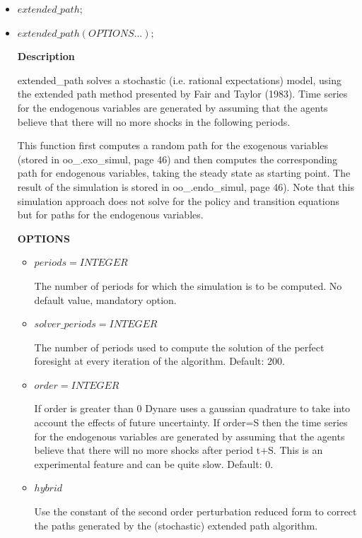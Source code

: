 \documentclass[cn,10pt,math=newtx,citestyle=gb7714-2015,bibstyle=gb7714-2015]{elegantbook}
\begin{document}
\begin{itemize}
	\item $extended\_path;$
	\item $extended\_path(OPTIONS...);$
	
	\textbf{Description}
	
	extended\_path solves a stochastic (i.e. rational expectations) model, using the extended path method presented by Fair and Taylor (1983). Time series for the endogenous variables are generated by assuming that the agents believe that there will no more shocks in the following periods.
	
	This function first computes a random path for the exogenous variables (stored in oo\_.exo\_simul, page 46) and then computes the corresponding path for endogenous variables, taking the steady state as starting point. The result of the simulation is stored in oo\_.endo\_simul, page 46). Note that this simulation approach does not solve for the policy and transition equations but for paths for the endogenous variables.
	
	\textbf{OPTIONS}
	\begin{itemize}
		\item $periods = INTEGER$
		
		The number of periods for which the simulation is to be computed. No default value, mandatory option.
		
		\item $solver\_periods = INTEGER$
		
		The number of periods used to compute the solution of the perfect foresight at every iteration of the algorithm. Default: 200.
		
		\item $order = INTEGER$
		
		If order is greater than 0 Dynare uses a gaussian quadrature to take into account the effects of future uncertainty. If order=S then the time series for the endogenous variables are generated by assuming that the agents believe that there will no more shocks after period t+S. This is an experimental feature and can be quite slow. Default: 0.
		
		\item $hybrid$
		
		Use the constant of the second order perturbation reduced form to correct the paths generated by the (stochastic) extended path algorithm.
	\end{itemize}
	
	
\end{itemize}
\end{document}
